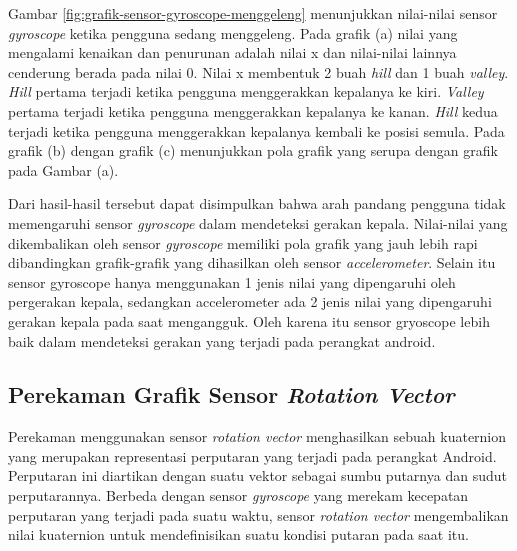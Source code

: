 Gambar \ref{fig:grafik-sensor-gyroscope-menggeleng} menunjukkan nilai-nilai sensor \textit{gyroscope} ketika pengguna sedang menggeleng. Pada grafik (a) nilai yang mengalami kenaikan dan penurunan adalah nilai x dan nilai-nilai lainnya cenderung berada pada nilai 0. Nilai x membentuk 2 buah \textit{hill} dan 1 buah \textit{valley}. \textit{Hill} pertama terjadi ketika pengguna menggerakkan kepalanya ke kiri. \textit{Valley} pertama terjadi ketika pengguna menggerakkan kepalanya ke kanan. \textit{Hill} kedua terjadi ketika pengguna menggerakkan kepalanya kembali ke posisi semula. Pada grafik (b) dengan grafik (c) menunjukkan pola grafik yang serupa dengan grafik pada Gambar (a).

Dari hasil-hasil tersebut dapat disimpulkan bahwa arah pandang pengguna tidak memengaruhi sensor \textit{gyroscope} dalam mendeteksi gerakan kepala. Nilai-nilai yang dikembalikan oleh sensor \textit{gyroscope} memiliki  pola grafik yang jauh lebih rapi dibandingkan grafik-grafik yang dihasilkan oleh sensor \textit{accelerometer}. Selain itu sensor gyroscope hanya menggunakan 1 jenis nilai yang dipengaruhi oleh pergerakan kepala, sedangkan accelerometer ada 2 jenis nilai yang dipengaruhi gerakan kepala pada saat mengangguk. Oleh karena itu sensor gryoscope lebih baik dalam mendeteksi gerakan yang terjadi pada perangkat android.

\subsection{Perekaman Grafik Sensor \textit{Rotation Vector}}
\label{sec:analisis_grafik_sensor_rotation_vector}

Perekaman menggunakan sensor \textit{rotation vector} menghasilkan sebuah kuaternion yang merupakan representasi perputaran yang terjadi pada perangkat Android. Perputaran ini diartikan dengan suatu vektor sebagai sumbu putarnya dan sudut perputarannya. Berbeda dengan sensor \textit{gyroscope} yang merekam kecepatan perputaran yang terjadi pada suatu waktu, sensor \textit{rotation vector} mengembalikan nilai kuaternion untuk mendefinisikan suatu kondisi putaran pada saat itu. 

